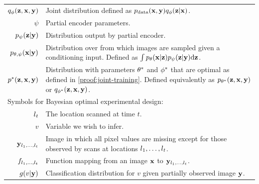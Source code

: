 \begin{table}
\begin{tabular}{rp{11cm}}
    $q_\phi({\mathbf{z}},{\mathbf{x}}, {\mathbf{y}})$                 & Joint distribution defined as $p_{\rm{data}} ({\mathbf{x}}, {\mathbf{y}})q_\phi({\mathbf{z}}|{\mathbf{x}})$. \\
    $\psi$                            & Partial encoder parameters. \\
    $p_\psi({\mathbf{z}}|{\mathbf{y}})$                 & Distribution output by partial encoder. \\
    $p_{\theta,\psi}({\mathbf{x}}|{\mathbf{y}})$             & Distribution over from which images are sampled given a conditioning input. Defined as $\int p_\theta({\mathbf{x}}|{\mathbf{z}})p_\psi({\mathbf{z}}|{\mathbf{y}}) \mathrm{d}{\mathbf{z}}$. \\
    ${p}^*{}({\mathbf{z}}, {\mathbf{x}}, {\mathbf{y}})$           & Distribution with parameters ${\theta}^*$ and ${\phi}^*$ that are optimal as defined in \cref{proof:joint-training}. Defined equivalently as $p_{{\theta}^*}({\mathbf{z}}, {\mathbf{x}}, {\mathbf{y}})$ or $q_{{\phi}^*}({\mathbf{z}},{\mathbf{x}},{\mathbf{y}})$.  \\
    \midrule
    \multicolumn{2}{l}{Symbols for Bayesian optimal experimental design:} \\
    $l{}_t$                                 & The location scanned at time $t$. \\
    $v$                                   & Variable we wish to infer. \\
    ${\mathbf{y}}_{l{}_1,\ldots,l{}_t}$             & Image in which all pixel values are missing except for those observed by scans at locations $l{}_1,\ldots,l{}_t$. \\
    $f_{l{}_1,\ldots,l{}_t}$                    & Function mapping from an image ${\mathbf{x}}$ to ${\mathbf{y}}_{l{}_1,\ldots,l{}_t}$. \\
    $g(v|{\mathbf{y}})$                       & Classification distribution for $v$ given partially observed image ${\mathbf{y}}$. \\
    \bottomrule
  \end{tabular}
  \vspace{-1em}
\end{table}


